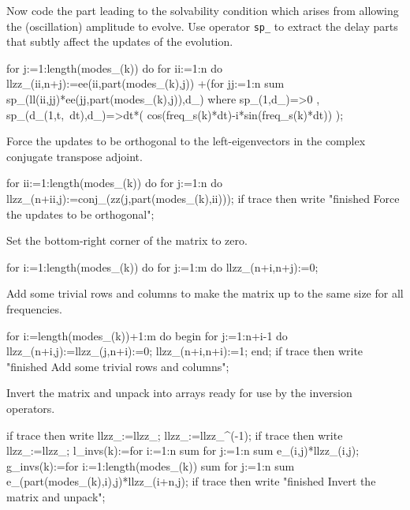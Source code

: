 \documentclass[11pt,a5paper]{article}
\begin{document}
Now code the part leading to the solvability condition which
arises from allowing the (oscillation) amplitude to evolve.
Use operator \verb|sp_| to extract the delay parts that
subtly affect the updates of the evolution.
\begin{reduce}
  for j:=1:length(modes_(k)) do 
    for ii:=1:n do llzz_(ii,n+j):=ee(ii,part(modes_(k),j))
     +(for jj:=1:n sum 
       sp_(ll(ii,jj)*ee(jj,part(modes_(k),j)),d_)
       where { sp_(1,d_)=>0
             , sp_(d_(1,t,~dt),d_)=>dt*(
               cos(freq_s(k)*dt)-i*sin(freq_s(k)*dt))
             });
\end{reduce}

Force the updates to be orthogonal to the left-eigenvectors
in the complex conjugate transpose adjoint.
\begin{reduce}
  for ii:=1:length(modes_(k)) do 
    for j:=1:n do llzz_(n+ii,j):=conj_(zz(j,part(modes_(k),ii)));
  if trace then write "finished Force the updates to be orthogonal";
\end{reduce}

Set the bottom-right corner of the matrix to zero.
\begin{reduce}
  for i:=1:length(modes_(k)) do 
    for j:=1:m do llzz_(n+i,n+j):=0;
\end{reduce}

Add some trivial rows and columns to make the matrix up to
the same size for all frequencies.
\begin{reduce}
  for i:=length(modes_(k))+1:m do begin 
    for j:=1:n+i-1 do llzz_(n+i,j):=llzz_(j,n+i):=0;
    llzz_(n+i,n+i):=1;
  end;
  if trace then write "finished Add some trivial rows and columns";
\end{reduce}

Invert the matrix and unpack into arrays ready for use by
the inversion operators.
\begin{reduce}
  if trace then write llzz_:=llzz_; 
  llzz_:=llzz_^(-1);
  if trace then write llzz_:=llzz_;
  l_invs(k):=for i:=1:n sum for j:=1:n sum e_(i,j)*llzz_(i,j);
  g_invs(k):=for i:=1:length(modes_(k)) sum 
    for j:=1:n sum e_(part(modes_(k),i),j)*llzz_(i+n,j);
if trace then write "finished Invert the matrix and unpack";
\end{reduce}
\end{document}
